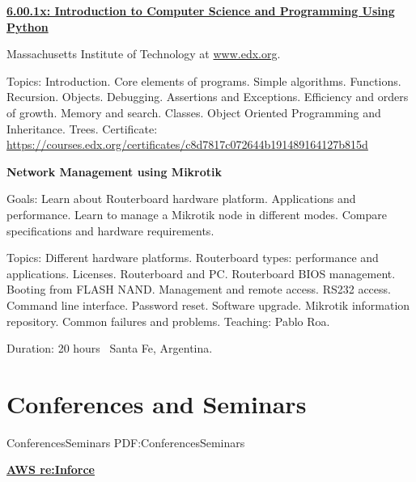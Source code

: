 \documentclass[letterpaper,MMMyyyy,nonstop]{simpleresumecv}
\begin{document}
\begin{body}
\begin{detail}
\end{detail}


\BigGap
\href{https://www.edx.org/course/introduction-to-computer-science-and-programming-using-python}{\textbf{6.00.1x: Introduction to Computer Science and Programming Using Python}}
\hfill
{}

\BulletItem Massachusetts Institute of Technology at \href{http://www.edx.org/}{www.edx.org}.
\begin{detail}
	\SubBulletItem
	Topics: Introduction. Core elements of programs. Simple algorithms. Functions. Recursion. Objects. Debugging. Assertions and Exceptions. Efficiency and orders of growth. Memory and search. Classes. Object Oriented Programming	and Inheritance. Trees.
	\SubBulletItem
	Certificate: \href{https://courses.edx.org/certificates/c8d7817c072644b191489164127b815d}
	{https://courses.edx.org/certificates/c8d7817c072644b191489164127b815d}
	
\end{detail}


\BigGap
\textbf{Network Management using Mikrotik}
\hfill
{}

\BulletItem Goals: Learn about Routerboard hardware platform. Applications and performance. Learn to manage a Mikrotik node in different modes. Compare specifications and hardware requirements.
\begin{detail}
	\SubBulletItem 
	Topics: Different hardware platforms. Routerboard types: performance and applications. Licenses. Routerboard and PC. Routerboard BIOS management. Booting from FLASH NAND. Management and remote access. RS232 access. Command line interface. Password reset. Software upgrade. Mikrotik information repository. Common failures and problems.
	\SubBulletItem Teaching: Pablo Roa.
\end{detail}
Duration: 20 hours \SubBulletSymbol\, Santa Fe, Argentina.



\section{Conferences\newline 
	and Seminars}
{ConferencesSeminars}
{PDF:ConferencesSeminars}

\href{https://reinforce.awsevents.com/}{\textbf{AWS re:Inforce}}
\hfill
{}


\end{body}
\end{document}
